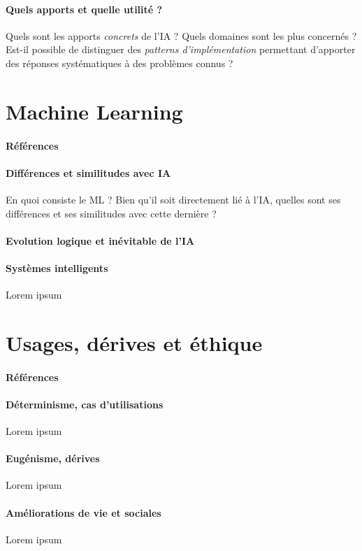 \paragraph{Quels apports et quelle utilité ?} Quels sont les apports \emph{concrets}
de l'IA ? Quels domaines sont les plus concernés ? Est-il possible de distinguer
des \emph{patterns d'implémentation} permettant d'apporter des réponses systématiques
à des problèmes connus ?


\section{Machine Learning}
\paragraph{Références} \cite{AlphaGo:0} \cite{AlphaGo:1}

\paragraph{Différences et similitudes avec IA} En quoi consiste le ML ? Bien qu'il soit
directement lié à l'IA, quelles sont ses différences et ses similitudes avec cette dernière ?

\paragraph{Evolution logique et inévitable de l'IA} 

\paragraph{Systèmes intelligents} Lorem ipsum


\section{Usages, dérives et éthique}
\paragraph{Références} \cite{Asimov:0} \cite{Damasio:0}

\paragraph{Déterminisme, cas d'utilisations} Lorem ipsum

\paragraph{Eugénisme, dérives} Lorem ipsum

\paragraph{Améliorations de vie et sociales} Lorem ipsum
